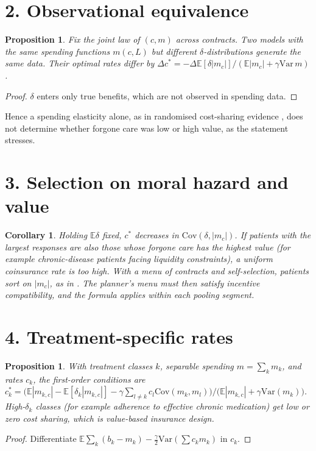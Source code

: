 \documentclass[11pt]{article}
\newtheorem{proposition}[theorem]{Proposition}
\newtheorem{corollary}[theorem]{Corollary}
\theoremstyle{definition}
\begin{document}
\section*{2. Observational equivalence}
\begin{proposition}\label{prop:oe}
Fix the joint law of $(c,m)$ across contracts. Two models with the same spending functions $m(c,L)$ but different
$\delta$-distributions generate the same data. Their optimal rates differ by
$\Delta c^*=-\Delta\mathbb E[\delta|m_c|]/(\mathbb E|m_c|+\gamma\mathrm{Var}\,m)$.
\end{proposition}
\begin{proof}
$\delta$ enters only true benefits, which are not observed in spending data.
\end{proof}
Hence a spending elasticity alone, as in randomised cost-sharing evidence \cite{rand}, does not determine whether forgone care
was low or high value, as the statement stresses.

\section*{3. Selection on moral hazard and value}
\begin{corollary}
Holding $\mathbb E\delta$ fixed, $c^*$ decreases in $\mathrm{Cov}(\delta,|m_c|)$. If patients with the largest responses are
also those whose forgone care has the highest value (for example chronic-disease patients facing liquidity constraints), a
uniform coinsurance rate is too high. With a menu of contracts and self-selection, patients sort on $|m_c|$, as in
\cite{efrsc}. The planner's menu must then satisfy incentive compatibility, and the formula applies within each pooling
segment.
\end{corollary}

\section*{4. Treatment-specific rates}
\begin{proposition}\label{prop:vbid}
With treatment classes $k$, separable spending $m=\sum_km_k$, and rates $c_k$, the first-order conditions are
$c_k^*=\bigl(\mathbb E|m_{k,c}|-\mathbb E[\delta_k|m_{k,c}|]-\gamma\sum_{l\ne k}c_l\mathrm{Cov}(m_k,m_l)\bigr)/\bigl(\mathbb E|m_{k,c}|+\gamma\mathrm{Var}(m_k)\bigr)$.
High-$\delta_k$ classes (for example adherence to effective chronic medication) get low or zero cost sharing, which is
value-based insurance design.
\end{proposition}
\begin{proof}
Differentiate $\mathbb E\sum_k(b_k-m_k)-\tfrac\gamma2\mathrm{Var}(\sum c_km_k)$ in $c_k$.
\end{proof}
\end{document}

